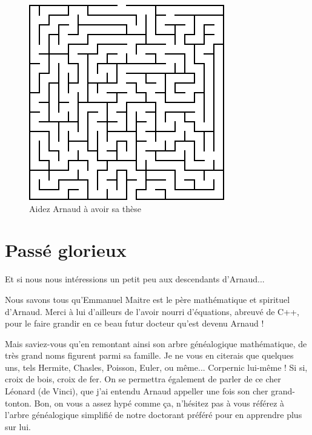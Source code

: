 \documentclass[a4paper]{leaflet}
\begin{document}
\begin{figure}
  \caption{Aidez Arnaud à avoir sa thèse}
\includegraphics{maz.png}
\end{figure}


\section*{Passé glorieux}

Et si nous nous intéressions un petit peu aux descendants d'Arnaud...

Nous savons tous qu'Emmanuel Maitre est le père mathématique et spirituel d'Arnaud. Merci à lui d'ailleurs de l'avoir nourri d'équations, abreuvé de C++, pour le faire grandir en ce beau futur docteur qu'est devenu Arnaud ! 

Mais saviez-vous qu'en remontant ainsi son arbre généalogique mathématique, de très grand noms figurent parmi sa famille. Je ne vous en citerais que quelques uns, tels Hermite, Chasles, Poisson, Euler, ou même... Corpernic lui-même ! Si si, croix de bois, croix de fer. On se permettra également de parler de ce cher Léonard (de Vinci), que j'ai entendu Arnaud appeller une fois son \og cher grand-tonton\fg. Bon, on vous a assez hypé comme ça, n'hésitez pas à vous référez à l'arbre généalogique simplifié de notre doctorant préféré pour en apprendre plus sur lui. 
\end{document}
